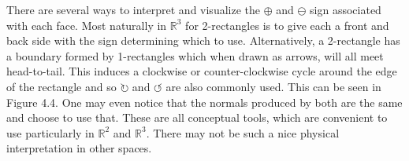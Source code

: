 \begin{figure}[ht]
\end{figure}

There are several ways to interpret and visualize the $\oplus$ and $\ominus$ sign associated with each face.
Most naturally in $\mathbb{R}^3$ for 2-rectangles is to give each a front and back side with the sign determining which to use.
Alternatively, a 2-rectangle has a boundary formed by 1-rectangles which when drawn as arrows, will all meet head-to-tail.
This induces a clockwise or counter-clockwise cycle around the edge of the rectangle and so $\circlearrowright$ and $\circlearrowleft$ are also commonly used.
This can be seen in Figure 4.4.
One may even notice that the normals produced by both are the same and choose to use that.
These are all conceptual tools, which are convenient to use particularly in $\mathbb{R}^2$ and $\mathbb{R}^3$.
There may not be such a nice physical interpretation in other spaces.


